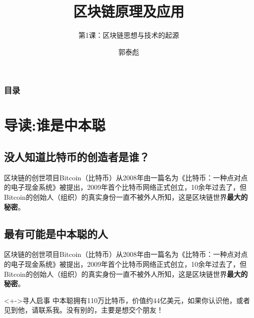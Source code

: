 \documentclass[11pt]{beamer}
\begin{document}
	\author{郭泰彪}
	\title{区块链原理及应用}
	\subtitle{第1课：区块链思想与技术的起源}

	\begin{frame}[plain]
		\maketitle
	\end{frame}
	
	\begin{frame}
		\frametitle{目录}
		\tableofcontents[sectionstyle=show,subsectionstyle=show/shaded]
	\end{frame}


\section{导读:谁是中本聪}
\subsection{没人知道比特币的创造者是谁？}
\begin{frame}
	区块链的创世项目Bitcoin（比特币）从2008年由一篇名为《比特币：一种点对点的电子现金系统》被提出，2009年首个比特币网络正式创立，10余年过去了，但Bitcoin的创始人（组织）的真实身份一直不被外人所知，这是区块链世界\textbf{最大的秘密}。
\end{frame}

\subsection{最有可能是中本聪的人}
\begin{frame}
	区块链的创世项目Bitcoin（比特币）从2008年由一篇名为《比特币：一种点对点的电子现金系统》被提出，2009年首个比特币网络正式创立，10余年过去了，但Bitcoin的创始人（组织）的真实身份一直不被外人所知，这是区块链世界\textbf{最大的秘密}。
	
	\hfill
	
	\begin{block}<+->{寻人启事}
	中本聪拥有{\huge 110万}比特币，价值约{\huge 44亿}美元，如果你认识他，或者见到他，请联系我。没有别的，主要是想交个朋友！
	\end{block}	
\end{frame}
\end{document}
